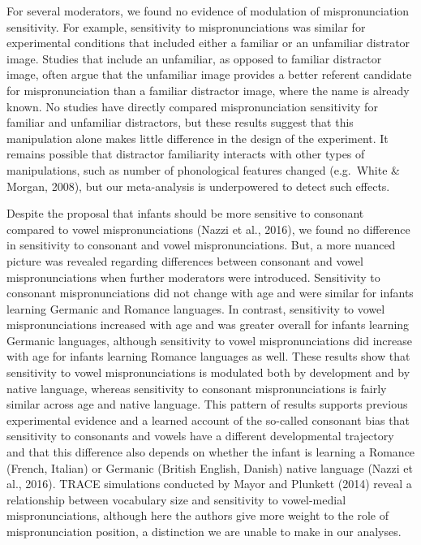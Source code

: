 \documentclass[man]{apa6}
\begin{document}
For several moderators, we found no evidence of modulation of mispronunciation sensitivity. For example, sensitivity to mispronunciations was similar for experimental conditions that included either a familiar or an unfamiliar distrator image. Studies that include an unfamiliar, as opposed to familiar distractor image, often argue that the unfamiliar image provides a better referent candidate for mispronunciation than a familiar distractor image, where the name is already known. No studies have directly compared mispronunciation sensitivity for familiar and unfamiliar distractors, but these results suggest that this manipulation alone makes little difference in the design of the experiment. It remains possible that distractor familiarity interacts with other types of manipulations, such as number of phonological features changed (e.g.~White \& Morgan, 2008), but our meta-analysis is underpowered to detect such effects.

Despite the proposal that infants should be more sensitive to consonant compared to vowel mispronunciations (Nazzi et al., 2016), we found no difference in sensitivity to consonant and vowel mispronunciations. But, a more nuanced picture was revealed regarding differences between consonant and vowel mispronunciations when further moderators were introduced. Sensitivity to consonant mispronunciations did not change with age and were similar for infants learning Germanic and Romance languages. In contrast, sensitivity to vowel mispronunciations increased with age and was greater overall for infants learning Germanic languages, although sensitivity to vowel mispronunciations did increase with age for infants learning Romance languages as well. These results show that sensitivity to vowel mispronunciations is modulated both by development and by native language, whereas sensitivity to consonant mispronunciations is fairly similar across age and native language. This pattern of results supports previous experimental evidence and a learned account of the so-called consonant bias that sensitivity to consonants and vowels have a different developmental trajectory and that this difference also depends on whether the infant is learning a Romance (French, Italian) or Germanic (British English, Danish) native language (Nazzi et al., 2016). TRACE simulations conducted by Mayor and Plunkett (2014) reveal a relationship between vocabulary size and sensitivity to vowel-medial mispronunciations, although here the authors give more weight to the role of mispronunciation position, a distinction we are unable to make in our analyses.
\end{document}
